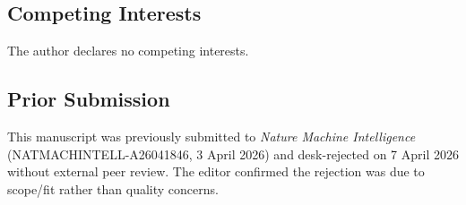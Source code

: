\documentclass[sn-basic]{sn-jnl}
\theoremstyle{definition}
\begin{document}
\subsection*{Competing Interests}
The author declares no competing interests.

\subsection*{Prior Submission}
This manuscript was previously submitted to \emph{Nature Machine Intelligence} (NATMACHINTELL-A26041846, 3 April 2026) and desk-rejected on 7 April 2026 without external peer review. The editor confirmed the rejection was due to scope/fit rather than quality concerns.


\end{document}
